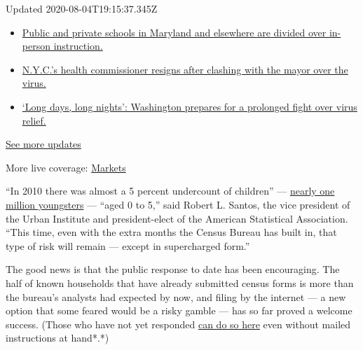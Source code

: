 Updated 2020-08-04T19:15:37.345Z

\begin{itemize}
\tightlist
\item
  \href{https://www.nytimes.com/2020/08/04/world/coronavirus-cases.html?action=click\&pgtype=Article\&state=default\&region=MAIN_CONTENT_1\&context=storylines_live_updates\#link-4825b93}{Public
  and private schools in Maryland and elsewhere are divided over
  in-person instruction.}
\item
  \href{https://www.nytimes.com/2020/08/04/world/coronavirus-cases.html?action=click\&pgtype=Article\&state=default\&region=MAIN_CONTENT_1\&context=storylines_live_updates\#link-4d1eafa8}{N.Y.C.'s
  health commissioner resigns after clashing with the mayor over the
  virus.}
\item
  \href{https://www.nytimes.com/2020/08/04/world/coronavirus-cases.html?action=click\&pgtype=Article\&state=default\&region=MAIN_CONTENT_1\&context=storylines_live_updates\#link-6b644638}{`Long
  days, long nights': Washington prepares for a prolonged fight over
  virus relief.}
\end{itemize}

\href{https://www.nytimes.com/2020/08/04/world/coronavirus-cases.html?action=click\&pgtype=Article\&state=default\&region=MAIN_CONTENT_1\&context=storylines_live_updates}{See
more updates}

More live coverage:
\href{https://www.nytimes.com/live/2020/08/04/business/stock-market-today-coronavirus?action=click\&pgtype=Article\&state=default\&region=MAIN_CONTENT_1\&context=storylines_live_updates}{Markets}

``In 2010 there was almost a 5 percent undercount of children'' ---
\href{https://www.census.gov/content/dam/Census/library/working-papers/2014/demo/2014-undercount-children.pdf}{nearly
one million youngsters} --- ``aged 0 to 5,'' said Robert L. Santos, the
vice president of the Urban Institute and president-elect of the
American Statistical Association. ``This time, even with the extra
months the Census Bureau has built in, that type of risk will remain ---
except in supercharged form.''

The good news is that the public response to date has been encouraging.
The half of known households that have already submitted census forms is
more than the bureau's analysts had expected by now, and filing by the
internet --- a new option that some feared would be a risky gamble ---
has so far proved a welcome success. (Those who have not yet responded
\href{https://2020census.gov}{can do so here} even without mailed
instructions at hand*.*)

